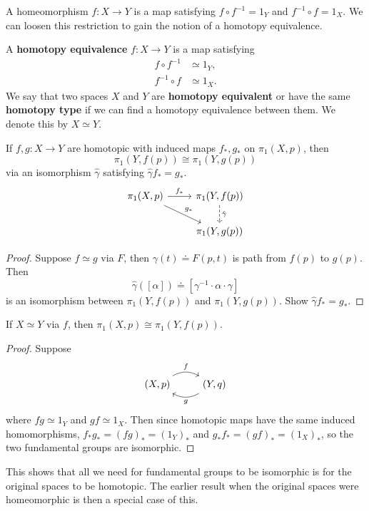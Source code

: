 \documentclass[twoside,10pt]{report}
\begin{document}
A homeomorphism $f:X\to Y$ is a map satisfying $f \circ f^{-1}=1_{Y}$ and $f^{-1} \circ f=1_{X}$. We can loosen this restriction to gain the notion of a homotopy equivalence.

\begin{defn}[]
	A \textbf{homotopy equivalence} $f:X\to Y$ is a map satisfying
\begin{align*}
	f \circ f^{-1} &\simeq 1_{Y},\\
	f^{-1} \circ f &\simeq 1_{X}.
\end{align*}
We say that two spaces $X$ and $Y$ are \textbf{homotopy equivalent} or have the same \textbf{homotopy type} if we can find a homotopy equivalence between them. We denote this by $X \simeq Y$.
\end{defn}

\begin{prop}
	If $f,g:X\to Y$ are homotopic with induced maps $f_{*},g_{*}$ on $\pi_1(X,p)$, then
	\[
		\pi_1(Y,f(p)) \cong \pi_1(Y,g(p))
	\] via an isomorphism $\hat{\gamma}$ satisfying $\hat{\gamma}f_{*}=g_{*}$.
\[
\begin{tikzcd}
	\pi_1(X,p)\rar{f_{*}}\arrow[dr,"g_{*}"]&\pi_1(Y,f(p))\dar[dashed]{\hat{\gamma}}\\
			     &\pi_1(Y,g(p))
\end{tikzcd}
\] 
\end{prop}
\begin{proof}
	Suppose $f \simeq g$ via $F$, then $\gamma(t) \doteq F(p,t)$ is path from $f(p)$ to $g(p)$. Then
	\[
		\hat{\gamma}([\alpha]) \doteq [\gamma^{-1} \cdot \alpha \cdot \gamma]
	\] is an isomorphism between $\pi_1(Y,f(p))$ and $\pi_1(Y,g(p))$. {\color{red}Show $\hat{\gamma}f_{*}=g_{*}$.}
\end{proof}

\begin{prop}
	If $X \simeq Y$ via $f$, then $\pi_1(X,p)\cong \pi_1(Y,f(p))$.
\end{prop}
\begin{proof}
	Suppose
	\[
        \begin{tikzcd}
                (X,p)\arrow[r,"f",bend left]&(Y,q)\arrow[l,"g",bend left]
        \end{tikzcd}
        \]
	where $fg \simeq 1_{Y}$ and $gf \simeq 1_{X}$. Then since homotopic maps have the same induced homomorphisms, $f_{*}g_{*}=(fg)_{*}=(1_{Y})_{*}$ and $g_{*}f_{*}=(gf)_{*}=(1_{X})_{*}$, so the two fundamental groups are isomorphic.
\end{proof}
This shows that all we need for fundamental groups to be isomorphic is for the original spaces to be homotopic. The earlier result when the original spaces were homeomorphic is then a special case of this.
\end{document}

